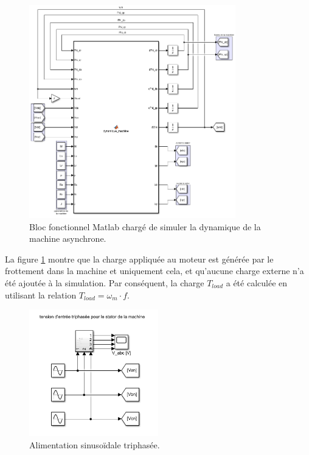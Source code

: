 \begin{figure}[!h]
    \centering
    \includegraphics[width=0.8\textwidth]{imgsMATLAB/MAS/MASblock/MASblock_dynamique.png} 
    \caption{Bloc fonctionnel Matlab chargé de simuler la dynamique de la machine asynchrone.}
    \label{img-MASblock_dynamique}
\end{figure}

La figure \ref{img-MASblock_dynamique} montre que la charge appliquée au moteur est générée par le frottement dans la machine et uniquement cela, et qu'aucune charge externe n'a été ajoutée à la simulation. Par conséquent, la charge $T_{load}$ a été calculée en utilisant la relation $T_{load} = \omega_m \cdot f$.

\begin{figure}[!h]
    \centering
    \includegraphics[width=0.5\textwidth]{imgsMATLAB/MAS/MAS/MAS_3f.png} 
    \caption{Alimentation sinusoïdale triphasée. }
    \label{img-MAS_3f}
\end{figure}

